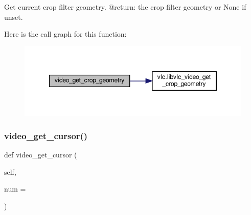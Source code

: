 \begin{DoxyVerb}Get current crop filter geometry.
@return: the crop filter geometry or None if unset.
\end{DoxyVerb}
 Here is the call graph for this function\+:
\nopagebreak
\begin{figure}[H]
\begin{center}
\leavevmode
\includegraphics[width=346pt]{classvlc_1_1_media_player_ab120cd3adba77eb2cbaa9e65eb279ae8_cgraph}
\end{center}
\end{figure}
\mbox{\label{classvlc_1_1_media_player_ab7dafcaa92a52013fbd88fd5d8d45588}} 
\subsubsection{\texorpdfstring{video\+\_\+get\+\_\+cursor()}{video\_get\_cursor()}}
{\footnotesize\ttfamily def video\+\_\+get\+\_\+cursor (\begin{DoxyParamCaption}\item[{}]{self,  }\item[{}]{num = {} }\end{DoxyParamCaption})}

